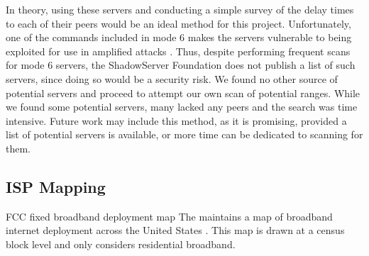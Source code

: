 In theory, using these servers and conducting a simple survey of the delay times to each of their peers would be an ideal method for this project. Unfortunately, one of the commands included in mode 6 makes the servers vulnerable to being exploited for use in amplified \ddos attacks \cite{USDepartmentofHomelandSecurity2014NTPCVE-2013-5211}. Thus, despite performing frequent scans for mode 6 servers, the ShadowServer Foundation does not publish a list of such servers, since doing so would be a security risk. We found no other source of potential servers and proceed to attempt our own scan of potential \ip ranges. While we found some potential servers, many lacked any peers and the search was time intensive. Future work may include this method, as it is promising, provided a list of potential servers is available, or more time can be dedicated to scanning for them.

\subsection{ISP Mapping}
FCC fixed broadband deployment map
 The \FCC maintains a map of broadband internet deployment across the United States \cite{FederalCommunicationsCommission}. This map is drawn at a census block level and only considers residential broadband.
